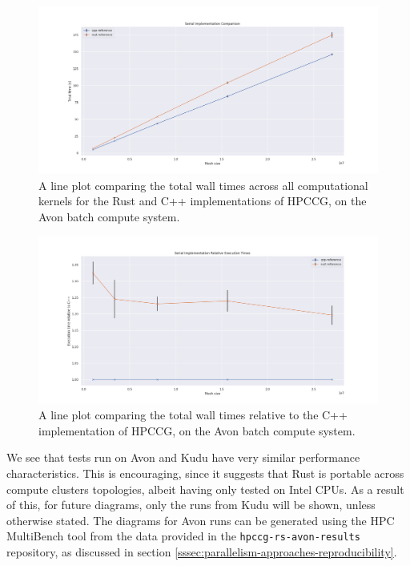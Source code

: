 \begin{figure}[H]
    \centering
    \includegraphics[width=\textwidth]{images/5_performance/parallelism/1_serial_line_avon.png}
    \caption{A line plot comparing the total wall times across all computational kernels for the Rust and C++ implementations of HPCCG, on the Avon batch compute system.}
    \label{fig:1_serial_line_avon}
\end{figure}

\begin{figure}[H]
    \centering
    \includegraphics[width=\textwidth]{images/5_performance/parallelism/2_serial_line_relative_avon.png}
    \caption{A line plot comparing the total wall times relative to the C++ implementation of HPCCG, on the Avon batch compute system.}
    \label{fig:2_serial_line_relative_avon}
\end{figure}

We see that tests run on Avon and Kudu have very similar performance characteristics. This is encouraging, since it suggests that Rust is portable across compute clusters topologies, albeit having only tested on Intel CPUs. As a result of this, for future diagrams, only the runs from Kudu will be shown, unless otherwise stated. The diagrams for Avon runs can be generated using the HPC MultiBench tool from the data provided in the \texttt{hpccg-rs-avon-results} repository, as discussed in section \ref{sssec:parallelism-approaches-reproducibility}.


